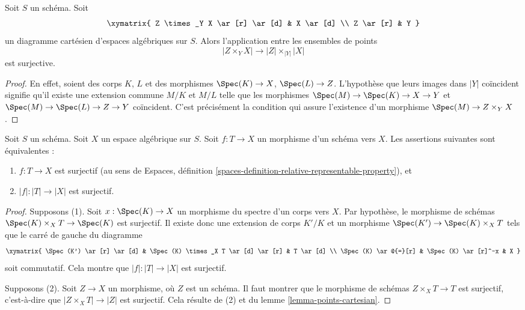 \begin{lemma}
\label{lemma-points-cartesian}
Soit $S$ un schéma. Soit
$$
\xymatrix{
Z \times_Y X \ar[r] \ar[d] & X \ar[d] \\
Z \ar[r] & Y
}
$$
un diagramme cartésien d'espaces algébriques sur $S$. Alors l'application entre les ensembles
de points
$$
|Z \times_Y X|
\longrightarrow
|Z| \times_{|Y|} |X|
$$
est surjective.
\end{lemma}

\begin{proof}
En effet, soient des corps $K$, $L$ et des morphismes
$\Spec(K) \to X$, $\Spec(L) \to Z$. L'hypothèse
que leurs images dans $|Y|$ coïncident signifie qu'il
existe une extension commune $M/K$ et $M/L$
telle que les morphismes
$\Spec(M) \to \Spec(K) \to X \to Y$ et
$\Spec(M) \to \Spec(L) \to Z \to Y$ coïncident.
C'est précisément la condition qui assure l'existence d'un
morphisme $\Spec(M) \to Z \times_Y X$.
\end{proof}

\begin{lemma}
\label{lemma-characterize-surjective}
Soit $S$ un schéma.
Soit $X$ un espace algébrique sur $S$.
Soit $f : T \to X$ un morphisme d'un schéma vers $X$.
Les assertions suivantes sont équivalentes :
\begin{enumerate}
\item $f : T \to X$ est surjectif (au sens de
Espaces, définition \ref{spaces-definition-relative-representable-property}),
et
\item $|f| : |T| \to |X|$ est surjectif.
\end{enumerate}
\end{lemma}

\begin{proof}
Supposons (1). Soit $x : \Spec(K) \to X$ un morphisme
du spectre d'un corps vers $X$. Par hypothèse, le morphisme de
schémas $\Spec(K) \times_X T \to \Spec(K)$ est surjectif.
Il existe donc une extension de corps $K'/K$ et un morphisme
$\Spec(K') \to \Spec(K) \times_X T$ tels que le carré
de gauche du diagramme
$$
\xymatrix{
\Spec(K') \ar[r] \ar[d] &
\Spec(K) \times_X T \ar[d] \ar[r] &
T \ar[d] \\
\Spec(K) \ar@{=}[r] &
\Spec(K) \ar[r]^-x & X
}
$$
soit commutatif. Cela montre que $|f| : |T| \to |X|$ est surjectif.

\medskip\noindent
Supposons (2). Soit $Z \to X$ un morphisme, où $Z$ est
un schéma. Il faut montrer que le morphisme de schémas $Z \times_X T \to T$
est surjectif, c'est-à-dire que $|Z \times_X T| \to |Z|$ est surjectif.
Cela résulte de (2) et du
lemme \ref{lemma-points-cartesian}.
\end{proof}

